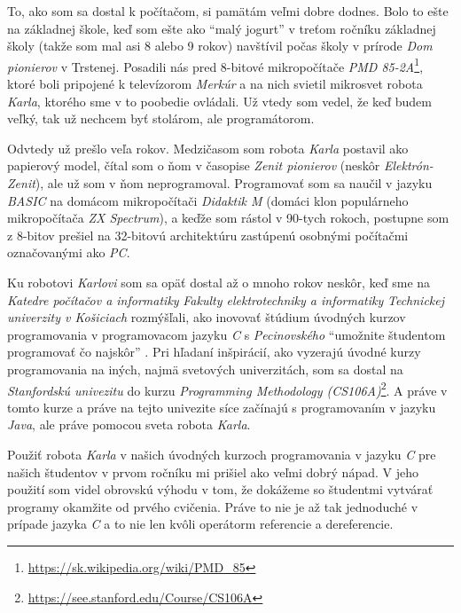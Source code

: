 
\label{ch:preface}

To, ako som sa dostal k počítačom, si pamätám veľmi dobre dodnes. Bolo to ešte na základnej škole, keď som ešte ako \enquote{malý jogurt} v treťom ročníku základnej školy (takže som mal asi 8 alebo 9 rokov) navštívil počas školy v prírode \emph{Dom pionierov} v Trstenej. Posadili nás pred 8-bitové mikropočítače \emph{PMD 85-2A}\footnote{\url{https://sk.wikipedia.org/wiki/PMD_85}}, ktoré boli pripojené k televízorom \emph{Merkúr} a na nich svietil mikrosvet robota \emph{Karla}, ktorého sme v to poobedie ovládali. Už vtedy som vedel, že keď budem veľký, tak už nechcem byť stolárom, ale programátorom.

Odvtedy už prešlo veľa rokov. Medzičasom som robota \emph{Karla} postavil ako papierový model, čítal som o ňom v časopise \emph{Zenit pionierov} (neskôr \emph{Elektrón-Zenit}), ale už som v ňom neprogramoval. Programovať som sa naučil v jazyku \emph{BASIC} na domácom mikropočítači \emph{Didaktik M} (domáci klon populárneho mikropočítača \emph{ZX Spectrum}), a keďže som rástol v 90-tych rokoch, postupne som z 8-bitov prešiel na 32-bitovú architektúru zastúpenú osobnými počítačmi označovanými ako \emph{PC}.

Ku robotovi \emph{Karlovi} som sa opäť dostal až o mnoho rokov neskôr, keď sme na \emph{Katedre počítačov a informatiky} \emph{Fakulty elektrotechniky a informatiky} \emph{Technickej univerzity v Košiciach} rozmýšľali, ako inovovať štúdium úvodných kurzov programovania v programovacom jazyku \emph{C} s \emph{Pecinovského} \enquote{umožnite študentom programovať čo najskôr} \cite{pecinovsky}. Pri hľadaní inšpirácií, ako vyzerajú úvodné kurzy programovania na iných, najmä svetových univerzitách, som sa dostal na \emph{Stanfordskú univezitu} do kurzu \emph{Programming Methodology (CS106A)}\footnote{\url{https://see.stanford.edu/Course/CS106A}}. A práve v tomto kurze a práve na tejto univezite síce začínajú s programovaním v jazyku \emph{Java}, ale práve pomocou sveta robota \emph{Karla}.

Použiť robota \emph{Karla} v našich úvodných kurzoch programovania v jazyku \emph{C} pre našich študentov v prvom ročníku mi prišiel ako veľmi dobrý nápad. V jeho použití som videl obrovskú výhodu v tom, že dokážeme so študentmi vytvárať programy okamžite od prvého cvičenia. Práve to nie je až tak jednoduché v prípade jazyka \emph{C} a to nie len kvôli operátorm referencie a dereferencie.

